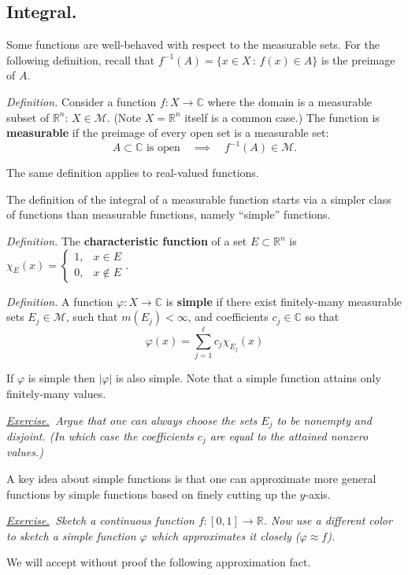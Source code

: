 \documentclass[12pt]{article}
\newcommand{\cM}{\mathcal{M}}
\newcommand{\CC}{\mathbb{C}}
\newcommand{\RR}{\mathbb{R}}
\newcommand{\ds}{\displaystyle}
\newcommand{\sect}[1]{\subsection*{#1.}}
\newcommand{\defin}{\emph{Definition.}\,\,}
\newcommand{\exer}[2]{\emph{\underline{Exercise.}\, #2} \vspace*{#1mm}}
\begin{document}


\sect{Integral}

Some functions are well-behaved with respect to the measurable sets.  For the following definition, recall that $f^{-1}(A)=\{x\in X\,:\,f(x)\in A\}$ is the preimage of $A$.

\defin Consider a function $f:X\to\CC$ where the domain is a measurable subset of $\RR^n$: $X \in \cM$.  (Note $X=\RR^n$ itself is a common case.)  The function is \textbf{measurable} if the preimage of every open set is a measurable set:
	$$A \subset \CC \text{ is open} \quad \implies \quad f^{-1}(A) \in \cM.$$

The same definition applies to real-valued functions.

The definition of the integral of a measurable function starts via a simpler class of functions than measurable functions, namely ``simple'' functions.

\defin The \textbf{characteristic function} of a set $E \subset \RR^n$ is\, $\ds \chi_E(x) = \begin{cases} 1, & x\in E \\ 0, & x \notin E \end{cases}$.

\defin A function $\varphi:X\to \CC$ is \textbf{simple} if there exist finitely-many measurable sets $E_j \in \cM$, such that $m(E_j)<\infty$, and coefficients $c_j \in \CC$ so that
	$$\boxed{\varphi(x) = \sum_{j=1}^\ell c_j \chi_{E_j}(x)}$$

If $\varphi$ is simple then $|\varphi|$ is also simple.  Note that a simple function attains only finitely-many values.

\exer{55}{Argue that one can always choose the sets $E_j$ to be nonempty and disjoint.  (In which case the coefficients $c_j$ are equal to the attained nonzero values.)}

A key idea about simple functions is that one can approximate more general functions by simple functions based on finely cutting up the $y$-axis.

\exer{50}{Sketch a continuous function $f:[0,1]\to\RR$.  Now use a different color to sketch a simple function $\varphi$ which approximates it closely ($\varphi\approx f$).}

We will accept without proof the following approximation fact.
\end{document}
